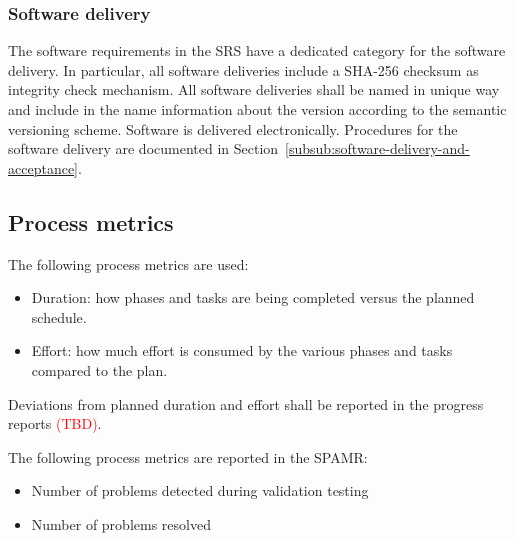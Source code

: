 \subsubsection{Software delivery}


The software requirements in the SRS have a dedicated category for the software delivery. In particular, all software deliveries include a SHA-256 checksum as integrity check mechanism. All software deliveries shall be named in unique way and include in the name information about the version according to the semantic versioning scheme. Software is delivered electronically. Procedures for the software delivery are documented in Section~\ref{subsub:software-delivery-and-acceptance}.

\subsection{Process metrics}
\label{subsec:process-metrics}


%
%

The following process metrics are used:
\begin{itemize}
    \item Duration: how phases and tasks are being completed versus the planned schedule.
    \item Effort: how much effort is consumed by the various phases and tasks compared to the plan.
\end{itemize}
Deviations from planned duration and effort shall be reported in the progress reports \textcolor{red}{(TBD)}.

The following process metrics are reported in the SPAMR:
\begin{itemize}
    \item Number of problems detected during validation testing
    \item Number of problems resolved
\end{itemize}

